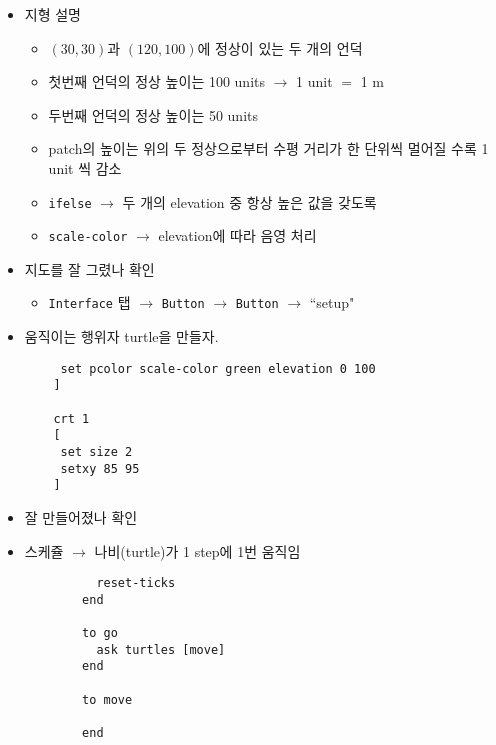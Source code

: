 \documentclass[hyperref={unicode}]{beamer}
\begin{document}
\begin{frame}[fragile]
\begin{itemize}
\item 지형 설명
	\begin{itemize}
	\item $(30,30)$과 $(120, 100)$에 정상이 있는 두 개의 언덕
	\item 첫번째 언덕의 정상 높이는 100 units $\rightarrow$ 1 unit $=$ 1 m
	\item 두번째 언덕의 정상 높이는 50 units
	\item patch의 높이는 위의 두 정상으로부터 수평 거리가 한 단위씩 멀어질 수록 1 unit 씩 감소
	\item \verb|ifelse| $\rightarrow$ 두 개의 elevation 중 항상 높은 값을 갖도록 
	\item \verb|scale-color| $\rightarrow$ elevation에 따라 음영 처리
	\end{itemize}
\item 지도를 잘 그렸나 확인
	\begin{itemize}
	\item \verb|Interface| 탭 $\rightarrow$ \verb|Button| $\rightarrow$ \verb|Button| $\rightarrow$ ``setup"
	\end{itemize}
\end{itemize}
\end{frame}

\begin{frame}[fragile]
\begin{itemize}
\item 움직이는 행위자 turtle을 만들자.
	\begin{verbatim}
	 set pcolor scale-color green elevation 0 100
	]
	
	crt 1
	[
	 set size 2
	 setxy 85 95
	]
	\end{verbatim}
\item 잘 만들어졌나 확인
\end{itemize}	
\end{frame}

\begin{frame}[fragile]
\begin{itemize}
\item 스케쥴 $\rightarrow$ 나비(turtle)가 1 step에 1번 움직임 
		\begin{verbatim}
		  reset-ticks
		end
		
		to go
		  ask turtles [move]
		end

		to move

		end
		\end{verbatim}		
\end{itemize}	
\end{frame}
\end{document}
